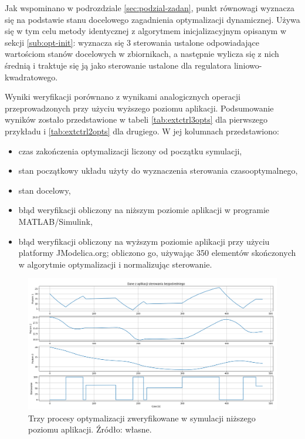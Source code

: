 Jak wspominano w podrozdziale \ref{sec:podzial-zadan}, punkt równowagi wyznacza się na podstawie stanu docelowego zagadnienia optymalizacji dynamicznej. Używa się w tym celu metody identycznej z algorytmem inicjalizacyjnym opisanym w sekcji \ref{sub:opt-init}: wyznacza się 3 sterowania ustalone odpowiadające wartościom stanów docelowych w zbiornikach, a następnie wylicza się z nich średnią i traktuje się ją jako sterowanie ustalone dla regulatora liniowo-kwadratowego.

Wyniki weryfikacji porównano z wynikami analogicznych operacji przeprowadzonych przy użyciu wyższego poziomu aplikacji. Podsumowanie wyników zostało przedstawione w tabeli \ref{tab:extctrl3opts} dla pierwszego przykładu i \ref{tab:extctrl2opts} dla drugiego. W jej kolumnach przedstawiono:
\begin{itemize}
    \item czas zakończenia optymalizacji liczony od początku symulacji,
    \item stan początkowy układu użyty do wyznaczenia sterowania czasooptymalnego,
    \item stan docelowy,
    \item błąd weryfikacji obliczony na niższym poziomie aplikacji w programie MATLAB/Simulink,
    \item błąd weryfikacji obliczony na wyższym poziomie aplikacji przy użyciu platformy JModelica.org; obliczono go, używając 350 elementów skończonych w algorytmie optymalizacji i normalizując sterowanie.
\end{itemize}

\begin{figure}
    \centering
    \includegraphics[scale=0.5,angle=90]{Grafika/ext_ctrl_3_opts}
    \caption{Trzy procesy optymalizacji zweryfikowane w symulacji niższego poziomu aplikacji. Źródło: własne.}
    \label{fig:extctrl3opts}
\end{figure}


